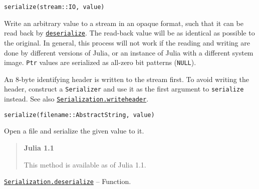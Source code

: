 \begin{adjustwidth}{2em}{0pt}


\begin{verbatim}
serialize(stream::IO, value)
\end{verbatim}

Write an arbitrary value to a stream in an opaque format, such that it can be read back by \hyperlink{5889257128684048834}{\texttt{deserialize}}. The read-back value will be as identical as possible to the original. In general, this process will not work if the reading and writing are done by different versions of Julia, or an instance of Julia with a different system image. \texttt{Ptr} values are serialized as all-zero bit patterns (\texttt{NULL}).

An 8-byte identifying header is written to the stream first. To avoid writing the header, construct a \texttt{Serializer} and use it as the first argument to \texttt{serialize} instead. See also \hyperlink{165660671771374050}{\texttt{Serialization.writeheader}}.




\begin{lstlisting}
serialize(filename::AbstractString, value)
\end{lstlisting}

Open a file and serialize the given value to it.

\begin{quote}
\textbf{Julia 1.1}

This method is available as of Julia 1.1.

\end{quote}


\end{adjustwidth}
\hypertarget{5889257128684048834}{}
\hyperlink{5889257128684048834}{\texttt{Serialization.deserialize}}  -- {Function.}

